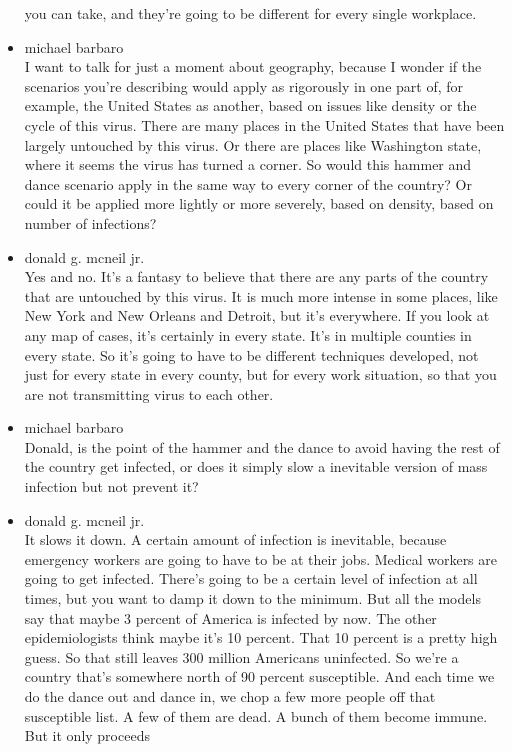 \begin{itemize}
  you can take, and they're going to be different for every single
  workplace.
\item
  michael barbaro\\
  I want to talk for just a moment about geography, because I wonder if
  the scenarios you're describing would apply as rigorously in one part
  of, for example, the United States as another, based on issues like
  density or the cycle of this virus. There are many places in the
  United States that have been largely untouched by this virus. Or there
  are places like Washington state, where it seems the virus has turned
  a corner. So would this hammer and dance scenario apply in the same
  way to every corner of the country? Or could it be applied more
  lightly or more severely, based on density, based on number of
  infections?
\item
  donald g. mcneil jr.\\
  Yes and no. It's a fantasy to believe that there are any parts of the
  country that are untouched by this virus. It is much more intense in
  some places, like New York and New Orleans and Detroit, but it's
  everywhere. If you look at any map of cases, it's certainly in every
  state. It's in multiple counties in every state. So it's going to have
  to be different techniques developed, not just for every state in
  every county, but for every work situation, so that you are not
  transmitting virus to each other.
\item
  michael barbaro\\
  Donald, is the point of the hammer and the dance to avoid having the
  rest of the country get infected, or does it simply slow a inevitable
  version of mass infection but not prevent it?
\item
  donald g. mcneil jr.\\
  It slows it down. A certain amount of infection is inevitable, because
  emergency workers are going to have to be at their jobs. Medical
  workers are going to get infected. There's going to be a certain level
  of infection at all times, but you want to damp it down to the
  minimum. But all the models say that maybe 3 percent of America is
  infected by now. The other epidemiologists think maybe it's 10
  percent. That 10 percent is a pretty high guess. So that still leaves
  300 million Americans uninfected. So we're a country that's somewhere
  north of 90 percent susceptible. And each time we do the dance out and
  dance in, we chop a few more people off that susceptible list. A few
  of them are dead. A bunch of them become immune. But it only proceeds

\end{itemize}
